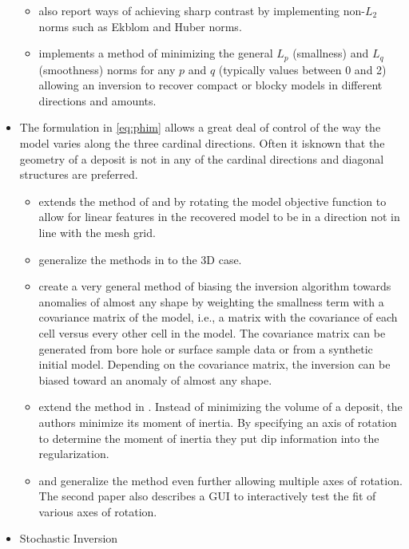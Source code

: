 \begin{itemize}
\begin{itemize}
\item \cite{farquharson1998non} also report ways of achieving sharp contrast by implementing non-$L_2$ norms such as Ekblom and Huber norms.
\item \cite{fournier2015cooperative} implements a method of minimizing the general $L_p$ (smallness) and $L_q$ (smoothness) norms for any $p$ and $q$ (typically values between 0 and 2) allowing an inversion to recover compact or blocky models in different directions and amounts.
\end{itemize}
\item The formulation in \autoref{eq:phim} allows a great deal of control of the way the model varies along the three cardinal directions. Often it isknown that the geometry of a deposit is not in any of the cardinal directions and diagonal structures are preferred.
\begin{itemize}
\item \cite{li2000incorporating}  extends the method of \cite{li19963} and \cite{li19983} by rotating the model objective function to allow for linear features in the recovered model to be in a direction not in line with the mesh grid.
\item \cite{lelievre2009comprehensive} generalize the methods in \cite{li2000incorporating} to the 3D case.
\item \cite{chasseriau20033d} create a very general method of biasing the inversion algorithm towards anomalies of almost any shape by weighting the smallness term with a covariance matrix of the model, i.e., a matrix with the covariance of each cell versus every other cell in the model. The covariance matrix can be generated from bore hole or surface sample data or from a synthetic initial model. Depending on the covariance matrix, the inversion can be biased toward an anomaly of almost any shape.
\item \cite{guillen1984gravity} extend the method in \cite{last1983compact}. Instead of minimizing the volume of a deposit, the authors minimize its moment of inertia. By specifying an axis of rotation to determine the moment of inertia they put dip information into the regularization.
\item \cite{barbosa1994generalized} and \cite{barbosa2006interactive} generalize the method even further allowing multiple axes of rotation. The second paper also describes a GUI to interactively test the fit of various axes of rotation.
\end{itemize}
\item Stochastic Inversion

\end{itemize}
